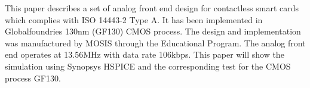 This paper describes a set of analog front end design for contactless smart cards which complies with ISO 14443-2 Type A. It has been implemented in Globalfoundries 130nm (GF130) CMOS process. The design and implementation was manufactured by MOSIS through the Educational Program. The analog front end operates at 13.56MHz with data rate 106kbps. This paper will show the simulation using Synopsys HSPICE and the corresponding test for the CMOS process GF130.